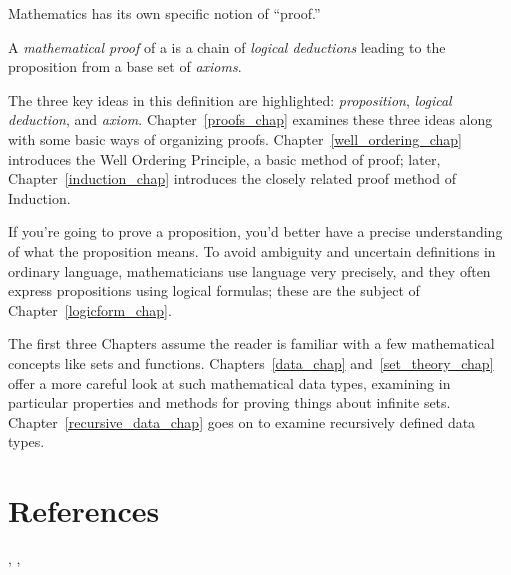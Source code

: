 Mathematics has its own specific notion of ``proof.''

\begin{definition*}
A \emph{mathematical proof} of a  is a chain of \emph{logical
deductions} leading to the proposition from a base set of%
\emph{axioms}.
\end{definition*}

The three key ideas in this definition are highlighted:
\emph{proposition}, \emph{logical deduction}, and \emph{axiom}.
Chapter~\ref{proofs_chap} examines these three ideas along with some
basic ways of organizing proofs.  Chapter~\ref{well_ordering_chap}
introduces the Well Ordering Principle, a basic method of proof; later,
Chapter~\ref{induction_chap} introduces the closely related proof
method of Induction.

If you're going to prove a proposition, you'd better have a precise
understanding of what the proposition means.  To avoid ambiguity and
uncertain definitions in ordinary language, mathematicians use
language very precisely, and they often express propositions using
logical formulas; these are the subject of
Chapter~\ref{logicform_chap}.

The first three Chapters assume the reader is familiar with a few
mathematical concepts like sets and functions.
Chapters~\ref{data_chap} and~\ref{set_theory_chap} offer a more
careful look at such mathematical data types, examining in particular
properties and methods for proving things about infinite sets.
Chapter~\ref{recursive_data_chap} goes on to examine recursively
defined data types.

\iffalse
Number theory is the study of properties of the integers.  This part
of the text ends with Chapter~\ref{number_theory_chap} on Number
theory because there are lots of easy-to-state and
interesting-to-prove properties of numbers.  This subject was once
thought to have few, if any, practical applications, but it has turned
out to have multiple applications in Computer Science.  For example,
most modern data encryption methods are based on Number theory.
\fi


\section{References}

 \cite{MR1818534},    %
 \cite{Velleman1994},
 \cite{MR1723092}     %

\endinput
